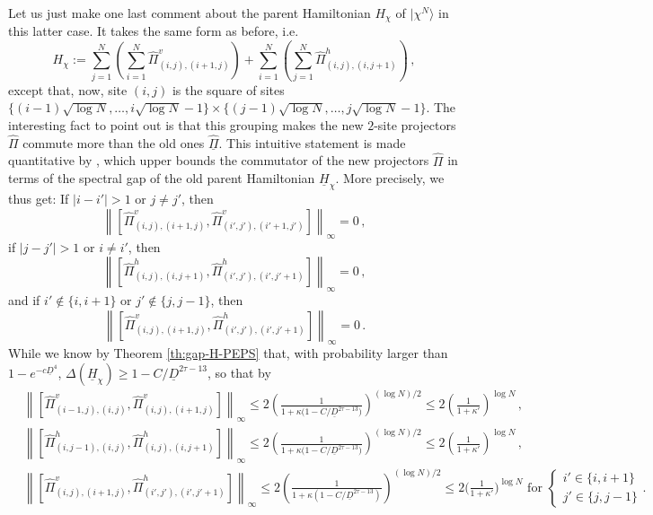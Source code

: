 \documentclass{amsart}
\renewcommand{\leq}{\leqslant}
\renewcommand{\geq}{\geqslant}
\newcommand{\ket}[1]{| #1 \rangle}
\begin{document}
Let us just make one last comment about the parent Hamiltonian $H_{\chi}$ of $\ket{\chi^N}$ in this latter case. It takes the same form as before, i.e.
\[ H_{\chi} := \sum_{j=1}^N \left( \sum_{i=1}^N \hat{\Pi}^v_{(i,j),(i+1,j)} \right) + \sum_{i=1}^N \left( \sum_{j=1}^N \hat{\Pi}^h_{(i,j),(i,j+1)} \right)  \, , \]
except that, now, site $(i,j)$ is the square of sites $\{(i-1)\sqrt{\log N},\ldots,i\sqrt{\log N}-1\} \times \{(j-1)\sqrt{\log N},\ldots,j\sqrt{\log N}-1\}$. The interesting fact to point out is that this grouping makes the new $2$-site projectors $\hat{\Pi}$ commute more than the old ones $\underline{\hat{\Pi}}$. This intuitive statement is made quantitative by \cite[Theorem 3]{KL}, which upper bounds the commutator of the new projectors $\hat{\Pi}$ in terms of the spectral gap of the old parent Hamiltonian $\underline{H}_{\chi}$. More precisely, we thus get: If $|i-i'|>1$ or $j\neq j'$, then
\[  \left\| \left[ \hat{\Pi}^v_{(i,j),(i+1,j)}, \hat{\Pi}^v_{(i',j'),(i'+1,j')} \right] \right\|_{\infty}=0 \, , \]
if $|j-j'|>1$ or $i\neq i'$, then
\[  \left\| \left[ \hat{\Pi}^h_{(i,j),(i,j+1)}, \hat{\Pi}^h_{(i',j'),(i',j'+1)} \right] \right\|_{\infty}=0 \, , \]
and if $i'\notin\{i,i+1\}$ or $j'\notin\{j,j-1\}$, then
\[  \left\| \left[ \hat{\Pi}^v_{(i,j),(i+1,j)}, \hat{\Pi}^h_{(i',j'),(i',j'+1)} \right] \right\|_{\infty}=0 \, . \]
While we know by Theorem \ref{th:gap-H-PEPS} that, with probability larger than $1-e^{-c\underline{D}^4}$, $\Delta(\underline{H}_{\chi})\geq 1-C/\underline{D}^{2\tau-13}$, so that by \cite[Theorem 3]{KL}
\begin{align*}
     & \left\| \left[ \hat{\Pi}^v_{(i-1,j),(i,j)}, \hat{\Pi}^v_{(i,j),(i+1,j)} \right] \right\|_{\infty} \leq 2\left(\frac{1}{1+\kappa\big(1-C/\underline{D}^{2\tau-13}\big)}\right)^{(\log N)/2}\leq 2\left(\frac{1}{1+\kappa'}\right)^{\log N} \, ,                                                                           \\
     & \left\| \left[ \hat{\Pi}^h_{(i,j-1),(i,j)}, \hat{\Pi}^h_{(i,j),(i,j+1)} \right] \right\|_{\infty} \leq 2\left(\frac{1}{1+\kappa\big(1-C/\underline{D}^{2\tau-13}\big)}\right)^{(\log N)/2} \leq 2\left(\frac{1}{1+\kappa'}\right)^{\log N} \, ,                                                                          \\
     & \left\| \left[ \hat{\Pi}^v_{(i,j),(i+1,j)}, \hat{\Pi}^h_{(i',j'),(i',j'+1)} \right] \right\|_{\infty} \leq 2\left(\frac{1}{1+\kappa\left(1-C/\underline{D}^{2\tau-13}\right)}\right)^{(\log N)/2} \leq 2\big(\frac{1}{1+\kappa'}\big)^{\log N} \text{ for } \begin{cases} i'\in\{i,i+1\} \\ j'\in\{j,j-1\} \end{cases} .
\end{align*}
\end{document}
